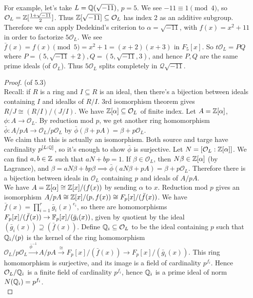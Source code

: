 \documentclass[a4paper]{article}
\begin{document}
For example, let's take $L=\mathbb{Q}(\sqrt{-11})$, $p=5$. We see $-11 \equiv 1 \pmod 4$, so $\mathcal{O}_L = \mathbb{Z} [ \frac{1+\sqrt{-11}}{2}]$. Thus $\mathbb{Z}[\sqrt{-11}] \subseteq \mathcal{O}_L$ has index 2 as an additive subgroup. Therefore we can apply Dedekind's criterion to $\alpha = \sqrt{-11}$, with $f(x) = x^2+11$ in order to factorize $5\mathcal{O}_L$. We see $\bar{f}(x) = f(x) \pmod 5 = x^2+1 = (x+2)(x+3)$ in $F_5[x]$. So $t\mathcal{O}_L = PQ$ where $P = (5,\sqrt{-11}+2), Q = (5,\sqrt{-11},3)$, and hence $P,Q$ are the same prime ideals (of $\mathcal{O}_L$). Thus $5\mathcal{O}_L$ splits completely in $\mathcal{Q}\sqrt{-11}$.

\begin{proof} (of 5.3)\\
Recall: if $R$ is a ring and $I \subseteq R$ is an ideal, then there's a bijection between ideals containing $I$ and idealks of $R/I$. 3rd isomorphism theorem gives $R/J \cong (R/I)/(J/I)$. We have $\mathbb{Z}[\alpha] \subseteq \mathcal{O}_L$ of finite index. Let $A = \mathbb{Z}[\alpha]$, $\phi:A \to \mathcal{O}_L$. By reduction mod $p$, we get another ring homomorphism $\bar{\phi}: A/pA \to \mathcal{O}_L / p\mathcal{O}_L$ by $\bar{\phi}(\beta+pA) = \beta + p\mathcal{O}_L$.\\
We claim that this is actually an isomorphism. Both source and targe have cardinality $p^{[L:\mathbb{Q}]}$, so it's enough to show $\bar{\phi}$ is surjective. Let $N=[\mathcal{O}_L:\mathbb{Z}[\alpha]]$. We can find $a,b \in \mathbb{Z}$ such that $aN+bp = 1$. If $\beta \in \mathcal{O}_L$, then $N\beta \in \mathbb{Z}[\alpha]$ (by Lagrance), and $\beta = aN\beta + bp\beta \implies \bar{\phi} (aN\beta + pA) = \beta + p\mathcal{O}_L$. Therefore there is a bijection between ideals in $\mathcal{O}_L$ containing $p$ and ideals of $A/pA$.\\
We have $A=\mathbb{Z}[\alpha] \cong \mathbb{Z}[x] / (f(x))$ by sending $\alpha$ to $x$. Reduction mod $p$ gives an isomorphism $A/pA \cong \mathbb{Z}[x] / (p,f(x)) \cong F_p[x]/ (\bar{f}(x))$. We have $\bar{f}(x) = \prod_{i=1}^r \bar{g}_i(x)^{e_i}$, so there are homomorphisms $F_p[x] / (\bar{f}(x)) \to \mathbb{F}_p[x]/(\bar{g}_i(x))$, given by quotient by the ideal $(\bar{g}_i (x)) \supseteq (\bar{f}(x))$. Define $\mathbb{Q}_i \subseteq \mathcal{O}_L$ to be the ideal containing $p$ such that $\mathbb{Q}_i/(p)$ is the kernel of the ring homomorphism $\mathcal{O}_L/p\mathcal{O}_L \xrightarrow{\bar{\phi}^{-1}} A/pA \xrightarrow{\cong} F_p[x]/(\bar{f}(x)) \to F_p[x]/(\bar{g}_i(x))$. This ring homomorphism is surjective, and its image is a field of cardinality $p^{f_i}$. Hence $\mathcal{O}_L/\mathbb{Q}_i$ is a finite field of cardinality $p^{f_i}$, hence $\mathbb{Q}_i$ is a prime ideal of norm $N(\mathbb{Q}_i) = p^{f_i}$.\\

\end{proof}
\end{document}
